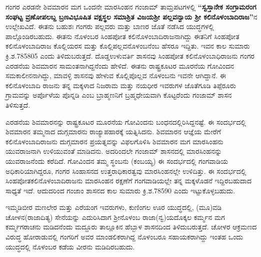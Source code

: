 ಗಂಗರ ಎರಡನೇ ಶಿವಮಾರನ ಮಗ ಒಂದನೇ ಮಾರಸಿಂಹನ ಗಂಜಾಮ್ ತಾಮ್ರಪಟಗಳಲ್ಲಿ \textbf{“ಸ್ವಸ್ತಾನೇಕ ಸಂಗ್ರಾಮರಂಗ ಸಂಘಟ್ಟ ವ್ರಣೋಪಲಬ್ದ ಬ್ರಣವಿಭೂಷಿತ ವಕ್ಷಸ್ಥಲ ಸಮಾಶ್ರಿತ ವಿಜಯಶ‍್ರೀ ಪಲ್ಲವನ್ವಾಯ ಶ‍್ರೀ ಕಲಿನೊಳಂಬಾದಿರಾಜ”}ನ ಉಲ್ಲೇಖವಿದೆ. ಈತನು ಬಹುಶಃ ಗಂಗರು ಪಲ್ಲವರು ಮತ್ತು ಬಾಣರ ಜೊತೆ ನಡೆಸಿದ ಯುದ್ಧಗಳಲ್ಲಿ ಪಾಲ್ಗೊಂಡಿರಬಹುದು. ಈತನು ನೊಳಂಬರ ಸಿಂಹಪೋತ ಕಲಿನೊಳಂಬಾದಿರಾಜನಾಗಿದ್ದು ಈತನಿಗೆ ಸಿಂಹಪೋತ ಕಲಿನೊಳಂಬಾದಿರಾಜ ಕೊಲ್ಲಿಯರಸ ಮತ್ತು ಕೊಲ್ಲಿಪಲ್ಲವನೊಳಂಬನೆಂಬ ಹೆಸರೂ ಇದ್ದಿತು. ಇವನ ಕಾಲ ಸುಮಾರು ಕ್ರಿ.ಶ.785805 ಎಂದು ತಿಳಿದುಬರುತ್ತದೆ. ದೊಡ್ಡಉಳುವರ್ತಿ ಶಾಸನವು ಸಿಂಹಪೋತ ಕಲಿನೊಳಂಬಾಧಿರಾಜನು ಗಂಗರ ಎರಡನೆಯ ಶಿವಮಾರನ ಸಾಮಂತನಾಗಿದ್ದನೆಂದು ಹೇಳಿದೆ. ಈತನು ರಾಷ್ಟ್ರಕೂಟರ ಮೂರನೆಯ ಗೋವಿಂದನ ಸಮಕಾಲೀನನಾಗಿದ್ದು, ಮಾವಳ್ಳಿ ಶಾಸನವು ಹೇಳುವ ಕೊಲ್ಲಿಪೊಲ್ಲವ ನೊಳಂಬನು ಇವನೇ ಆಗಿದ್ದಾನೆ. ಈ ಕಲಿನೊಳಂಬಾದಿ ರಾಜನು ತನ್ನ ಮಕ್ಕಳಾದ ನಿಜರಾಮ ಮತ್ತು ನಯಧೀರ ಇವರುಗಳ ಜೊತೆಗೂಡಿ ತಿಪ್ಪೆರೂರು ಗ್ರಾಮವನ್ನು ಅರ್ಪೊಳೆಯ ಪೊನ್ನಡಿ ಎಂಬ ಬ್ರಾಹ್ಮಣನಿಗೆ ಬ್ರಹ್ಮಧೇಯವಾಗಿ ಕೊಟ್ಟರೆಂದು ಗಂಜಾಮ್ ಶಾಸನ ತಿಳಿಸುತ್ತದೆ.

ಎರಡನೆಯ ಶಿವಮಾರನನ್ನು ರಾಷ್ಟ್ರಕೂಟರ ಮೂರನೆಯ ಗೋವಿಂದನು ಬಂಧನದಲ್ಲಿರಿಸಿದ್ದನಷ್ಟೆ. ಈ ಸಂದರ್ಭದಲ್ಲಿ ಶಿವಮಾರನ ತಮ್ಮನಾದ ದುಗ್ಗಮಾರನು ರಾಜ್ಯಾಪಹಾರಕ್ಕೆ ಯತ್ನಿಸಿದನು. ಶಿವಮಾರನ ಆಜ್ಞೆಯ ಮೇರೆಗೆ ಕಲಿನೊಳಂಬಾದಿ\-ರಾಜನು ದುಗ್ಗಮಾರನ ಪ್ರಯತ್ನವನ್ನು ವಿಫಲಗೊಳಿಸಿ ಶಿವಮಾರನ ಮಗ ಮಾರಸಿಂಹನು ಯುವರಾಜನಾಗಿ ಉಳಿಯುವಂತೆ ಮಾಡಿದನು. ಅದರಿಂದಲೇ ಗಂಜಾಮ್ ಶಾಸನದಲ್ಲಿ ಮಾರಸಿಂಹನನ್ನು ಯುವರಾಜನೆಂದು ಕರೆದಿದೆ. ಗೋವಿಂದನ ತಮ್ಮ ಸ್ಥಂಬನು (ಕಂಬಯ್ಯ) ಈ ಸಂದರ್ಭದಲ್ಲಿ ಗಂಗವಾಡಿಯ ಅಧಿಕಾರಿಯಾಗಿದ್ದರೂ, ಗಂಗರ ಸಿಂಹಾಸನದ ಉತ್ತರಾಧಿಕಾರತ್ವವು ಮಾರಸಿಂಹನಲ್ಲೇ ಉಳಿದಿತ್ತು. ಈ ಸಂದರ್ಭದಲ್ಲಿ ಸಿಂಹಪೋತಕಲಿನೊಳಂಬಾದಿರಾಜನು ಮಾರಸಿಂಹನ ರಕ್ಷಣೆಗೆ ಗಂಗವಾಡಿ\-ಯಲ್ಲೇ ತನ್ನ ಮಕ್ಕಳೊಡನೆ ಇದ್ದಿರಬಹುದಾದ ಸಾಧ್ಯತೆ ಇದೆ. ಆದುದರಿಂದ ಗಂಜಾಂ ಶಾಸನದ ಕಾಲ ಸುಮಾರು ಕ್ರಿ.ಶ.78590 ಎಂದು ಇಟ್ಟುಕೊಳ್ಳಬಹುದು.

ಇಮ್ಮಡಿಬೀರ ಮಣಲೇರ ಮತ್ತು ಎರೆಯಂಗ ಇವರುಗಳು, ಕುಣಿಂಗಲ ಊರ ಯುದ್ಧದಲ್ಲಿ, (ಮೂ)ವಡಿ ಚೋಳನ\break (ರಾಜಾದಿತ್ಯ) ಸೇನೆಯನ್ನು ಎದುರಿಸಿದಾಗ ಶ‍್ರೀನೊಳಂಬ ರಾಜಾ(ನ್ವ)ಯದೊಕ್ಕಲ ಕರ್ಮ್ಮನ ಮಗ ಕರ್ಮ್ಮಗರಾಚನು ಮಡಿದನೆಂದು ಮದ್ದೂರು ತಾಲ್ಲೂಕಿನ ಹೆಬ್ಬಾಳ ಶಾಸನದಿಂದ ತಿಳಿದುಬರುತ್ತದೆ. ಚೋಳರ ಆಕ್ರಮಣದ ವಿರುದ್ಧ ಹೋರಾಡುವಲ್ಲಿ ಗಂಗರಿಗೆ ಅವರ ಮಾಂಡಲಿಕರಾಗಿದ್ದ ನೊಳಂಬರೂ ಸಹಾಯಕರಾಗಿದ್ದು ಇಂತಹ ಒಂದು ಯುದ್ಧದಲ್ಲಿ ನೊಳಂಬರ ಕಡೆಯ ವೀರನು ಮಡಿದಿರಬಹುದು. 

